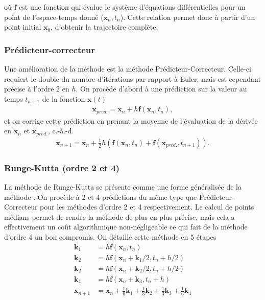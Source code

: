     où $\bm{f}$ est une fonction qui évalue le système d'équations
    différentielles pour un point de l'espace-temps donné ($\bm{x}_n, t_n$).
    Cette relation permet donc à partir d'un point initial $\bm{x}_0$,
    d'obtenir la trajectoire complète.

    \subsubsection{Prédicteur-correcteur} \label{subsubsec: pred-corr}
    Une amélioration de la méthode  est la méthode
    Prédicteur-Correcteur. Celle-ci requiert le double du nombre d'itérations
    par rapport à Euler, mais est cependant précise à l'ordre 2 en $h$. On
    procède d'abord à une prédiction sur la valeur au temps $t_{n + 1}$ de la
    fonction $\bm{x}(t)$
    \begin{align*}
        \bm{x}_{pred.} = \bm{x}_n + h\bm{f}(\bm{x}_n, t_n),
    \end{align*}
    et on corrige cette prédiction en prenant la moyenne de l'évaluation de la
    dérivée en $\bm{x}_n$ et $\bm{x}_{pred.}$, c.-à.-d.
    \begin{align*}
        \bm{x}_{n + 1} = \bm{x}_n + \frac{1}{2}h(\bm{f}(\bm{x}_n, t_n) +
        \bm{f}(\bm{x}_{pred.}, t_{n + 1})).
    \end{align*}

    \subsubsection{Runge-Kutta (ordre 2 et 4)} \label{subsubsec: runge-kutta}
    La méthode de Runge-Kutta se présente comme une forme généralisée de la
    méthode . On procède à 2 et 4 prédictions du
    même type que Prédicteur-Correcteur pour les méthodes d'ordre 2 et 4
    respectivement. Le calcul de points médians permet de rendre la méthode de
    plus en plus précise, mais cela a effectivement un coût algorithmique
    non-négligeable ce qui fait de la méthode d'ordre 4 un bon compromis. On
    détaille cette méthode en 5 étapes
    \begin{align*}
        \bm{k}_1 &= h\bm{f}(\bm{x}_n, t_n) \\
        \bm{k}_2 &= h\bm{f}(\bm{x}_n + \bm{k}_1/2, t_n + h/2) \\
        \bm{k}_2 &= h\bm{f}(\bm{x}_n + \bm{k}_2/2, t_n + h/2) \\
        \bm{k}_4 &= h\bm{f}(\bm{x}_n + \bm{k}_3, t_n + h) \\
        \bm{x}_{n + 1} &= \bm{x}_n + \frac{1}{6}\bm{k}_1 + \frac{1}{3}\bm{k}_2
        + \frac{1}{3}\bm{k}_3 + \frac{1}{6}\bm{k}_4
    \end{align*}

